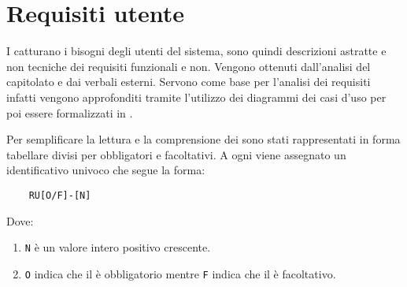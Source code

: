 \section{Requisiti utente}
\label{sec:requisiti_utente}
I  catturano i bisogni degli utenti del sistema, sono quindi descrizioni astratte e non tecniche dei requisiti funzionali e non.
Vengono ottenuti dall'analisi del capitolato e dai verbali esterni.
Servono come base per l'analisi dei requisiti infatti vengono approfonditi tramite l'utilizzo dei diagrammi dei casi d'uso per poi essere formalizzati in .   

Per semplificare la lettura e la comprensione dei  sono stati rappresentati in forma tabellare divisi per  obbligatori e  facoltativi.
A ogni  viene assegnato un identificativo univoco che segue la forma:
\begin{lstlisting}
    RU[O/F]-[N]
\end{lstlisting}
Dove:
\begin{enumerate}
    \item \lstinline{N} è un valore intero positivo crescente.
    \item \lstinline{O} indica che il  è obbligatorio mentre \lstinline{F} indica che il  è facoltativo.
\end{enumerate} 



